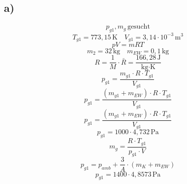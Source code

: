 

\subsection*{a)}
\[
p_{g1}, m_g \, \text{gesucht}
\]
\[
T_{g1} = 773{,}15 \, \text{K} \quad V_{g1} = 3{,}14 \cdot 10^{-3} \, \text{m}^3
\]
\[
pV = mRT
\]
\[
m_2 = 32 \, \text{kg} \quad m_{EW} = 0{,}1 \, \text{kg}
\]
\[
R = \frac{1}{M} \cdot \bar{R} = \frac{166{,}28 \, \text{J}}{\text{kg} \cdot \text{K}}
\]
\[
p_{g1} = \frac{m_{g1} \cdot R \cdot T_{g1}}{V_{g1}}
\]
\[
p_{g1} = \frac{(m_{g1} + m_{EW}) \cdot R \cdot T_{g1}}{V_{g1}}
\]
\[
p_{g1} = \frac{(m_{g1} + m_{EW}) \cdot R \cdot T_{g1}}{V_{g1}}
\]
\[
p_{g1} = 1000 \cdot 4{,}732 \, \text{Pa}
\]
\[
m_g = \frac{R \cdot T_{g1}}{p_{g1} \cdot V}
\]
\[
p_{g1} = p_{amb} + \frac{3}{A} \cdot (m_{K} + m_{EW})
\]
\[
p_{g1} = 1400 \cdot 4{,}8573 \, \text{Pa}
\]